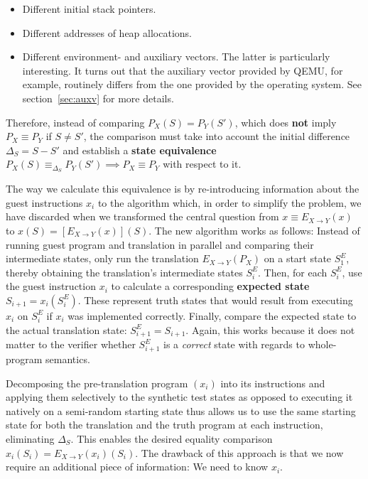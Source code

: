 \begin{itemize}
    \item Different initial stack pointers.
    \item Different addresses of heap allocations.
    \item Different environment- and auxiliary vectors. The latter is particularly interesting. It turns out that
        the auxiliary vector provided by QEMU, for example, routinely differs from the one provided by the operating
        system. See section~\ref{sec:auxv} for more details.
\end{itemize}

Therefore, instead of comparing $P_X(S) = P_Y(S')$, which does \textbf{not} imply $P_X \equiv P_Y$ if $S \neq S'$, the
comparison must take into account the initial difference $\Delta_S = S - S'$ and establish a \textbf{state equivalence}
$P_X(S) \equiv_{\Delta_S} P_Y(S') \implies P_X \equiv P_Y$ with respect to it.

The way we calculate this equivalence is by re-introducing information about the guest instructions $x_i$ to the
algorithm which, in order to simplify the problem, we have discarded when we transformed the central question from $x
\equiv E_{X \rightarrow Y}(x)$ to $x(S) = [E_{X \rightarrow Y}(x)](S)$. The new algorithm works as follows: Instead of
running guest program and translation in parallel and comparing their intermediate states, only run the translation
$E_{X \rightarrow Y}(P_X)$ on a start state $S^E_1$, thereby obtaining the translation's intermediate states $S^E_i$.
Then, for each $S^E_i$, use the guest instruction $x_i$ to calculate a corresponding \textbf{expected state} $S_{i+1} =
x_i(S^E_i)$. These represent truth states that would result from executing $x_i$ on $S^E_i$ if $x_i$ was implemented
correctly. Finally, compare the expected state to the actual translation state: $S^E_{i+1} = S_{i+1}$. Again, this works
because it does not matter to the verifier whether $S^E_{i+1}$ is a \textit{correct} state with regards to whole-program
semantics.

Decomposing the pre-translation program $(x_i)$ into its instructions and applying them selectively to the synthetic
test states as opposed to executing it natively on a semi-random starting state thus allows us to use the same starting
state for both the translation and the truth program at each instruction, eliminating $\Delta_S$. This enables the
desired equality comparison $x_i(S_i) = E_{X \rightarrow Y}(x_i)(S_i)$. The drawback of this approach is that we now
require an additional piece of information: We need to know $x_i$.

